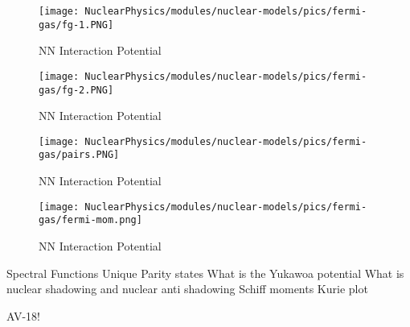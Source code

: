      \begin{figure}[H]
        \centering
        \texttt{[image: NuclearPhysics/modules/nuclear-models/pics/fermi-gas/fg-1.PNG]}
        \caption{NN Interaction Potential}
    \end{figure}       
    
    
     
     \begin{figure}[H]
        \centering
        \texttt{[image: NuclearPhysics/modules/nuclear-models/pics/fermi-gas/fg-2.PNG]}
        \caption{NN Interaction Potential}
    \end{figure}       


 
     \begin{figure}[H]
        \centering
        \texttt{[image: NuclearPhysics/modules/nuclear-models/pics/fermi-gas/pairs.PNG]}
        \caption{NN Interaction Potential}
    \end{figure}       
    
    
     
     \begin{figure}[H]
        \centering
        \texttt{[image: NuclearPhysics/modules/nuclear-models/pics/fermi-gas/fermi-mom.png]}
        \caption{NN Interaction Potential}
    \end{figure}       

Spectral Functions
Unique Parity states
What is the Yukawoa potential
What is nuclear shadowing and nuclear anti shadowing
Schiff moments
Kurie plot

AV-18!

